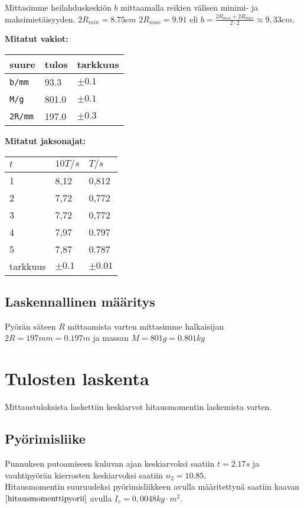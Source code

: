 \documentclass[]{article}
\begin{document}
Mittasimme heilahduskeskiön \(b\) mittaamalla reikien välisen minimi- ja
maksimietäisyyden. \(2R_{min}=8.75cm\) \(2R_{max}=9.91\) eli
\(b= \frac{2R_{min}+2R_{max}}{2\cdot2} \approx 9,33cm\).

\textbf{Mitatut vakiot:}

\begin{longtable}[]{@{}lll@{}}
\toprule
suure & tulos & tarkkuus\tabularnewline
\midrule
\endhead
\texttt{b/mm} & 93.3 & \(\pm0.1\)\tabularnewline
\texttt{M/g} & 801.0 & \(\pm0.1\)\tabularnewline
\texttt{2R/mm} & 197.0 & \(\pm0.3\)\tabularnewline
\bottomrule
\end{longtable}

\textbf{Mitatut jaksonajat:}

\begin{longtable}[]{@{}lll@{}}
\toprule
\(t\) & \(10 T/s\) & \(T/s\)\tabularnewline
\midrule
\endhead
1 & 8,12 & 0,812\tabularnewline
2 & 7,72 & 0,772\tabularnewline
3 & 7,72 & 0,772\tabularnewline
4 & 7,97 & 0.797\tabularnewline
5 & 7,87 & 0.787\tabularnewline
tarkkuus & \(\pm0.1\) & \(\pm0.01\)\tabularnewline
\bottomrule
\end{longtable}

\subsection{Laskennallinen määritys}\label{laskennallinen-maaritys-1}

Pyörän säteen \(R\) mittaamista varten mittasimme halkaisijan
\(2R=197mm=0.197m\) ja massan \(M=801g=0.801kg\)

\section{Tulosten laskenta}\label{tulosten-laskenta}

Mittaustuloksista laskettiin keskiarvot hitausmomentin laskemista
varten.

\subsection{Pyörimisliike}\label{pyorimisliike-2}

Punnuksen putoamiseen kuluvan ajan keskiarvoksi saatiin \(t=2.17s\) ja
vauhtipyörän kierrosten keskiarvoksi saatiin \(n_2=10.85\).\\
Hitausmomentin suuruudeksi pyörimisliikkeen avulla määritettynä saatiin
kaavan \(\eqref{hitausmomenttipyorii}\) avulla
\(I_c = 0,0048kg\cdot m^2\).
\end{document}
